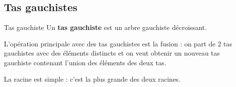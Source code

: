 \subsection{Tas gauchistes}
\begin{defin}{Tas gauchiste}{}
Un {\bf tas gauchiste} est un arbre gauchiste décroissant.
\end{defin}
L'opération principale avec des tas gauchistes est la fusion : on part de 2 tas gauchistes avec des éléments distincts et on veut obtenir un nouveau tas gauchiste contenant l'union des éléments des deux tas.

La racine est simple : c'est la plus grande des deux racines.

